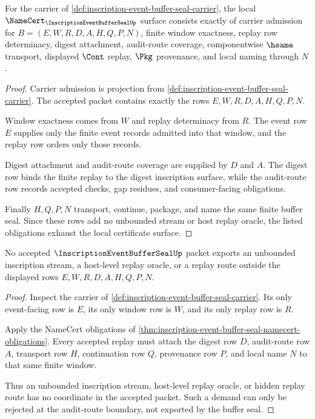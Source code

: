 \begin{theorem}
\label{thm:inscription-event-buffer-seal-namecert-obligations}
For the carrier of \autoref{def:inscription-event-buffer-seal-carrier}, the
local $\NameCert_{\InscriptionEventBufferSealUp}$ surface consists exactly of
carrier admission for $B=(E,W,R,D,A,H,Q,P,N)$, finite window exactness, replay
row determinacy, digest attachment, audit-route coverage, componentwise
$\hsame$ transport, displayed $\Cont$ replay, $\Pkg$ provenance, and local
naming through $N$.
\end{theorem}
\begin{proof}
Carrier admission is projection from
\autoref{def:inscription-event-buffer-seal-carrier}. The accepted packet
contains exactly the rows $E,W,R,D,A,H,Q,P,N$.

Window exactness comes from $W$ and replay determinacy from $R$. The event row
$E$ supplies only the finite event records admitted into that window, and the
replay row orders only those records.

Digest attachment and audit-route coverage are supplied by $D$ and $A$. The
digest row binds the finite replay to the digest inscription surface, while
the audit-route row records accepted checks, gap residues, and consumer-facing
obligations.

Finally $H,Q,P,N$ transport, continue, package, and name the same finite buffer
seal. Since these rows add no unbounded stream or host replay oracle, the
listed obligations exhaust the local certificate surface.
\end{proof}

\begin{theorem}
\label{thm:inscription-event-buffer-seal-nonescape}
No accepted $\InscriptionEventBufferSealUp$ packet exports an unbounded
inscription stream, a host-level replay oracle, or a replay route outside the
displayed rows $E,W,R,D,A,H,Q,P,N$.
\end{theorem}
\begin{proof}
Inspect the carrier of
\autoref{def:inscription-event-buffer-seal-carrier}. Its only event-facing row
is $E$, its only window row is $W$, and its only replay row is $R$.

Apply the NameCert obligations of
\autoref{thm:inscription-event-buffer-seal-namecert-obligations}. Every
accepted replay must attach the digest row $D$, audit-route row $A$, transport
row $H$, continuation row $Q$, provenance row $P$, and local name $N$ to that
same finite window.

Thus an unbounded inscription stream, host-level replay oracle, or hidden
replay route has no coordinate in the accepted packet. Such a demand can only
be rejected at the audit-route boundary, not exported by the buffer seal.
\end{proof}

